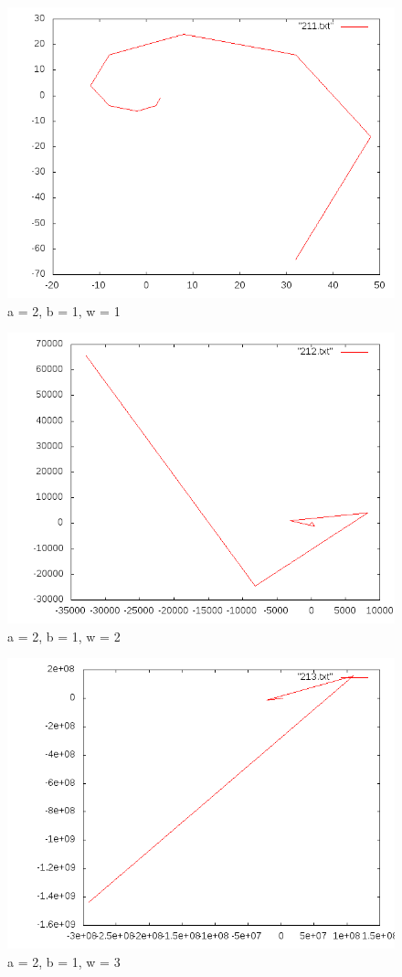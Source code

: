 \documentclass[12pt]{article}
\begin{document}
\begin{figure}[h!]
  \caption{a = 2, b = 1, w = 1}
  \centering
    \includegraphics[scale=0.3]{211.png}
\end{figure}
\begin{figure}[h!]
  \caption{a = 2, b = 1, w = 2}
  \centering
    \includegraphics[scale=0.3]{212.png}
\end{figure}
\begin{figure}[h!]
  \caption{a = 2, b = 1, w = 3}
  \centering
    \includegraphics[scale=0.3]{213.png}
\end{figure}
\end{document}
